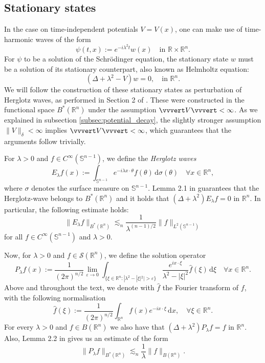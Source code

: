 \documentclass[10pt,a4paper]{amsart}
\theoremstyle{remark}
\theoremstyle{definition}
\newcommand{\R}{\mathbb{R}}
\newcommand{\Sph}{\mathbb{S}}
\newcommand{\dd}{\mathrm{d}}
\def\ve{\varepsilon}
\def\lec{\lesssim}
\def\wh{\widehat}
\def\cal{\mathcal}
\begin{document}
\subsection{Stationary states}\label{sec: stationary states}
In the case on time-independent potentials $V=V(x)$, one can make use of time-harmonic waves of the form
%
\[
\psi(t, x):= e^{-i\lambda^2t} w(x) \quad\text{in } \R\times \R^n.
\]
%
For $\psi$ to be a solution of the Schr\"odinger equation, the stationary state $w$ must be a solution of its stationary counterpart, also known as Helmholtz equation:
\[
(\Delta+\lambda^2-V)w=0, \quad  \text{in }  \R^n.
\]
We will follow the construction of these stationary states as perturbation of Herglotz waves, as performed in Section 2 of \cite{zbMATH08122191}. These were constructed in the functional space $B^*(\R^n)$ under the assumption $\vvvert V \vvvert < \infty$. As we explained in subsection \ref{subsec:potential_decay}, the slightly stronger assumption $\| V \|_\delta < \infty$ implies $\vvvert V \vvvert < \infty$, which guarantees that the arguments follow trivially.


For $\lambda>0$ and $f\in C^\infty(\Sph^{n-1})$, we define the \textit{Herglotz waves}
% 
\begin{equation}\label{eq: Herglotz}
E_\lambda f(x) := \int_{\Sph^{n-1}} e^{-i\lambda x \cdot \theta} f(\theta) \, \dd\sigma(\theta) \quad \forall x\in \R^n,
\end{equation}
%
where $\sigma$ denotes the surface measure on $\Sph^{n-1}$. Lemma 2.1 in \cite{zbMATH08122191} guarantees that the Herglotz-wave belongs to $B^*(\R^n)$ and it holds that 
$(\Delta+\lambda^2)E_\lambda f=0$ in $\R^n$.  
In particular, the following estimate holds:
%
\begin{equation*}
\| E_\lambda f\|_{B^*(\R^n)} \lec_n \frac{1}{\lambda^{(n-1)/2}} \| f\|_{L^2(\Sph^{n-1})}
\end{equation*}
%
for all $f\in C^\infty(\Sph^{n-1})$ and $\lambda>0$. 

%
Now, for $\lambda>0$ and $f\in \cal{S}(\R^n)$, we define the solution operator
%
\[
P_\lambda f(x) := \frac{1}{(2\pi)^{n/2}} \lim_{\ve \to 0} \int_{\{ \xi\in \R^n: | \lambda^2-|\xi|^2| > \ve \}} \frac{e^{i x \cdot \xi}}{\lambda^2-|\xi|^2} \wh{f}(\xi) \, \dd \xi \quad \forall x\in \R^n.
\]
%
Above and throughout the text, we denote with $\wh f$ the Fourier transform of $f$, with the following normalisation 
%
\[
\wh f(\xi):= \frac{1}{(2\pi)^{n/2}} \int_{\R^n} f(x) e^{-ix\cdot\xi} \, \dd x, \quad \forall \xi\in\R^n.
\]
%
For every $\lambda>0$ and $f\in B(\R^n)$ we also have that $(\Delta + \lambda^2) P_\lambda f= f$ in $\R^n$. 
%
Also, Lemma 2.2 in \cite{zbMATH08122191} gives us an estimate of the form
%
\begin{equation}\label{eq: Plambda_bound}
\| P_\lambda f \|_{B^*(\R^n)} \lec_n \frac{1}{\lambda} \| f\|_{B(\R^n)} .
\end{equation}
%
\end{document}
